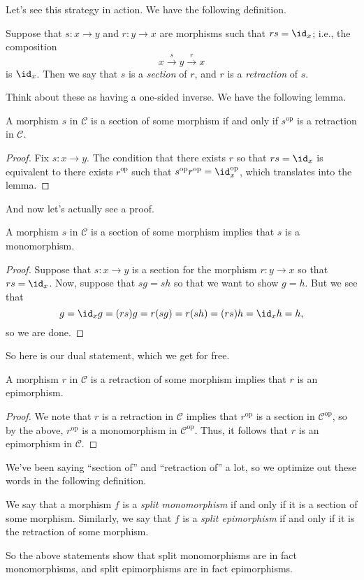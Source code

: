 Let's see this strategy in action. We have the following definition.
\begin{definition}
	Suppose that $s:x\to y$ and $r:y\to x$ are morphisms such that $rs=\id_x$; i.e., the composition
	\[x\stackrel s\to y\stackrel r\to x\]
	is $\id_x$. Then we say that $s$ is a \textit{section} of $r$, and $r$ is a \textit{retraction} of $s$.
\end{definition}
Think about these as having a one-sided inverse. We have the following lemma.
\begin{lemma}
	A morphism $s$ in $\mathcal C$ is a section of some morphism if and only if $s^\mathrm{op}$ is a retraction in $\mathcal C$.
\end{lemma}
\begin{proof}
	Fix $s:x\to y$. The condition that there exists $r$ so that $rs=\id_x$ is equivalent to there exists $r^\mathrm{op}$ such that $s^\mathrm{op}r^\mathrm{op}=\id_x^\mathrm{op}$, which translates into the lemma.
\end{proof}
And now let's actually see a proof.
\begin{proposition}
	A morphism $s$ in $\mathcal C$ is a section of some morphism implies that $s$ is a monomorphism.
\end{proposition}
\begin{proof}
	Suppose that $s:x\to y$ is a section for the morphism $r:y\to x$ so that $rs=\id_x$. Now, suppose that $sg=sh$ so that we want to show $g=h$. But we see that
	\[g=\id_xg=(rs)g=r(sg)=r(sh)=(rs)h=\id_xh=h,\]
	so we are done.
\end{proof}
So here is our dual statement, which we get for free.
\begin{proposition}
	A morphism $r$ in $\mathcal C$ is a retraction of some morphism implies that $r$ is an epimorphism.
\end{proposition}
\begin{proof}
	We note that $r$ is a retraction in $\mathcal C$ implies that $r^\mathrm{op}$ is a section in $\mathcal C^\mathrm{op}$, so by the above, $r^\mathrm{op}$ is a monomorphism in $\mathcal C^\mathrm{op}$. Thus, it follows that $r$ is an epimorphism in $\mathcal C$.
\end{proof}
We've been saying ``section of'' and ``retraction of'' a lot, so we optimize out these words in the following definition.
\begin{definition}
	We say that a morphism $f$ is a \textit{split monomorphism} if and only if it is a section of some morphism. Similarly, we say that $f$ is a \textit{split epimorphism} if and only if it is the retraction of some morphism.
\end{definition}
So the above statements show that split monomorphisms are in fact monomorphisms, and split epimorphisms are in fact epimorphisms.

